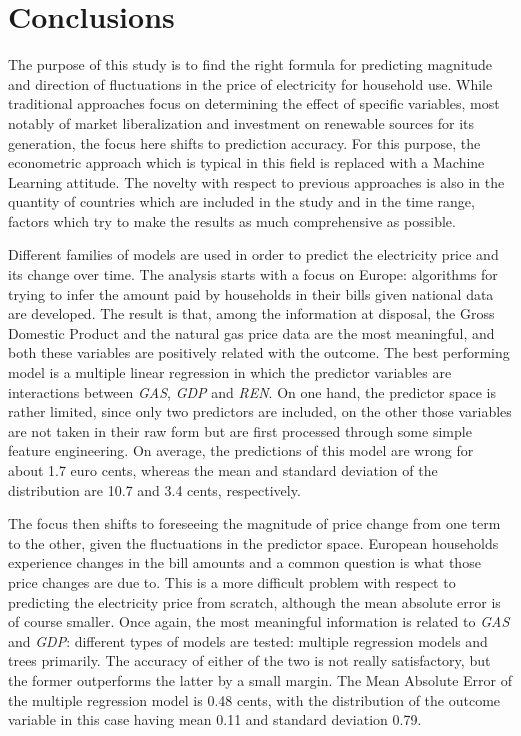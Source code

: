 \documentclass[a4paper,12pt]{book}
\begin{document}
\chapter{Conclusions}

The purpose of this study is to find the right formula for predicting magnitude and direction of fluctuations in the price of electricity for household use. While traditional approaches focus on determining the effect of specific variables, most notably of market liberalization and investment on renewable sources for its generation, the focus here shifts to prediction accuracy. For this purpose, the econometric approach which is typical in this field is replaced with a Machine Learning attitude. The novelty with respect to previous approaches is also in the quantity of countries which are included in the study and in the time range, factors which try to make the results as much comprehensive as possible.

Different families of models are used in order to predict the electricity price and its change over time. The analysis starts with a focus on Europe: algorithms for trying to infer the amount paid by households in their bills given national data are developed. The result is that, among the information at disposal, the Gross Domestic Product and the natural gas price data are the most meaningful, and both these variables are positively related with the outcome. The best performing model is a multiple linear regression in which the predictor variables are interactions between \textit{GAS}, \textit{GDP} and \textit{REN}. On one hand, the predictor space is rather limited, since only two predictors are included, on the other those variables are not taken in their raw form but are first processed through some simple feature engineering. On average, the predictions of this model are wrong for about 1.7 euro cents, whereas the mean and standard deviation of the distribution are 10.7 and 3.4 cents, respectively.

The focus then shifts to foreseeing the magnitude of price change from one term to the other, given the fluctuations in the predictor space. European households experience changes in the bill amounts and a common question is what those price changes are due to. This is a more difficult problem with respect to predicting the electricity price from scratch, although the mean absolute error is of course smaller. Once again, the most meaningful information is related to \textit{GAS} and \textit{GDP}: different types of models are tested: multiple regression models and trees primarily. The accuracy of either of the two is not really satisfactory, but the former outperforms the latter by a small margin. The Mean Absolute Error of the multiple regression model is 0.48 cents, with the distribution of the outcome variable in this case having mean 0.11 and standard deviation 0.79.
\end{document}
